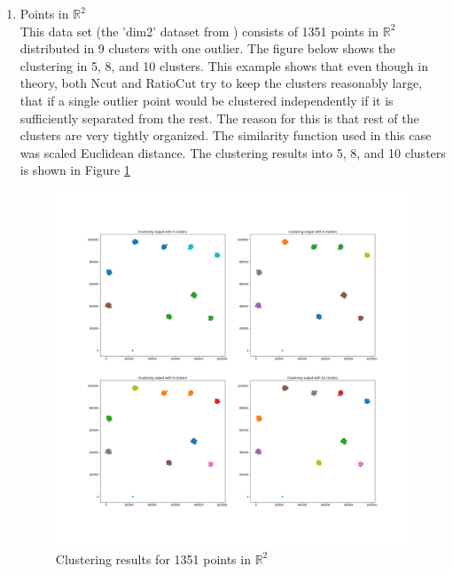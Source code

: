 \documentclass[10pt,a4paper, nocenter]{report}
\begin{document}
\begin{enumerate}
        \item{Points in $\mathbb{R}^2$}\\
        This data set (the 'dim2' dataset from \cite{DIMLow}) consists of 1351 points in $\mathbb{R}^2$ distributed in 9 clusters with one outlier. The figure below shows the clustering in 5, 8, and 10 clusters. This example shows that even though in theory, both Ncut and RatioCut try to keep the clusters reasonably large, that if a single outlier point would be clustered independently if it is sufficiently separated from the rest. The reason for this is that rest of the clusters are very tightly organized. The similarity function used in this case was scaled Euclidean distance. The clustering results into 5, 8, and 10 clusters is shown in Figure \ref{fig:2dresults}
        \begin{figure}[h]
        \includegraphics[width=\textwidth]{../../images/2DCluster.jpg}
        \caption{Clustering results for 1351 points in $\mathbb{R}^2$}
        \label{fig:2dresults}
        \end{figure}


\end{enumerate}
\end{document}
